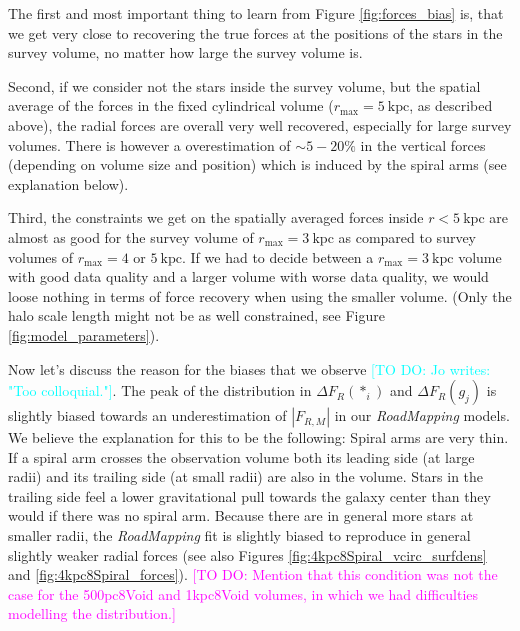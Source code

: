 \documentclass[iop,revtex4,numberedappendix,appendixfloats]{emulateapj}
\newcommand{\RM}{{\sl RoadMapping}}
\newcommand{\Wilma}[1]{\textcolor{Magenta}{#1}}
\newcommand{\Jo}[1]{\textcolor{Cyan}{#1}}
\begin{document}
The first and most important thing to learn from Figure \ref{fig:forces_bias} is, that we get very close to recovering the true forces at the positions of the stars in the survey volume, no matter how large the survey volume is.

Second, if we consider not the stars inside the survey volume, but the spatial average of the forces in the fixed cylindrical volume ($r_\text{max}=5~\text{kpc}$, as described above), the radial forces are overall very well recovered, especially for large survey volumes. There is however a overestimation of $\sim5-20\%$ in the vertical forces (depending on volume size and position) which is induced by the spiral arms (see explanation below).

Third, the constraints we get on the spatially averaged forces inside $r<5~\text{kpc}$ are almost as good for the survey volume of $r_\text{max}=3~\text{kpc}$ as compared to survey volumes of $r_\text{max}=4$ or $5~\text{kpc}$. If we had to decide between a $r_\text{max}=3~\text{kpc}$ volume with good data quality and a larger volume with worse data quality, we would loose nothing in terms of force recovery when using the smaller volume. (Only the halo scale length might not be as well constrained, see Figure \ref{fig:model_parameters}).

Now let's discuss the reason for the biases that we observe \Jo{[TO DO: Jo writes: "Too colloquial."]}. The peak of the distribution in $\Delta F_R(*_i)$ and $\Delta F_R(g_j)$ is slightly biased towards an underestimation of $|F_{R,M}|$ in our \RM{} models. We believe the explanation for this to be the  following: Spiral arms are very thin. If a spiral arm crosses the observation volume both its leading side (at large radii) and its trailing side (at small radii) are also in the volume. Stars in the trailing side feel a lower gravitational pull towards the galaxy center than they would if there was no spiral arm. Because there are in general more stars at smaller radii, the \RM{} fit is slightly biased to reproduce in general slightly weaker radial forces (see also Figures \ref{fig:4kpc8Spiral_vcirc_surfdens} and \ref{fig:4kpc8Spiral_forces}). \Wilma{[TO DO: Mention that this condition was not the case for the 500pc8Void and 1kpc8Void volumes, in which we had difficulties modelling the distribution.]}
\end{document}
